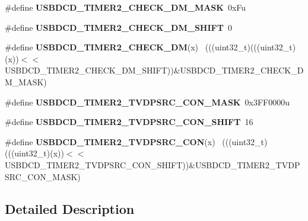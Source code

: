 \begin{DoxyCompactItemize}
\item 
\hypertarget{group___u_s_b_d_c_d___register___masks_gad18eb9508e92e1ff61f1ebdb431665c6}{}\#define {\bfseries U\+S\+B\+D\+C\+D\+\_\+\+T\+I\+M\+E\+R2\+\_\+\+C\+H\+E\+C\+K\+\_\+\+D\+M\+\_\+\+M\+A\+S\+K}~0x\+Fu\label{group___u_s_b_d_c_d___register___masks_gad18eb9508e92e1ff61f1ebdb431665c6}

\item 
\hypertarget{group___u_s_b_d_c_d___register___masks_gab9400adaabb773fb452040ae6130f0ef}{}\#define {\bfseries U\+S\+B\+D\+C\+D\+\_\+\+T\+I\+M\+E\+R2\+\_\+\+C\+H\+E\+C\+K\+\_\+\+D\+M\+\_\+\+S\+H\+I\+F\+T}~0\label{group___u_s_b_d_c_d___register___masks_gab9400adaabb773fb452040ae6130f0ef}

\item 
\hypertarget{group___u_s_b_d_c_d___register___masks_gaf7bad1d25f77ef01168762501b1b6bf7}{}\#define {\bfseries U\+S\+B\+D\+C\+D\+\_\+\+T\+I\+M\+E\+R2\+\_\+\+C\+H\+E\+C\+K\+\_\+\+D\+M}(x)                            ~(((uint32\+\_\+t)(((uint32\+\_\+t)(x))$<$$<$U\+S\+B\+D\+C\+D\+\_\+\+T\+I\+M\+E\+R2\+\_\+\+C\+H\+E\+C\+K\+\_\+\+D\+M\+\_\+\+S\+H\+I\+F\+T))\&U\+S\+B\+D\+C\+D\+\_\+\+T\+I\+M\+E\+R2\+\_\+\+C\+H\+E\+C\+K\+\_\+\+D\+M\+\_\+\+M\+A\+S\+K)\label{group___u_s_b_d_c_d___register___masks_gaf7bad1d25f77ef01168762501b1b6bf7}

\item 
\hypertarget{group___u_s_b_d_c_d___register___masks_ga605cbc2c9a476de6aa9f303d8ee8e7da}{}\#define {\bfseries U\+S\+B\+D\+C\+D\+\_\+\+T\+I\+M\+E\+R2\+\_\+\+T\+V\+D\+P\+S\+R\+C\+\_\+\+C\+O\+N\+\_\+\+M\+A\+S\+K}~0x3\+F\+F0000u\label{group___u_s_b_d_c_d___register___masks_ga605cbc2c9a476de6aa9f303d8ee8e7da}

\item 
\hypertarget{group___u_s_b_d_c_d___register___masks_gaf40b7173544983b30be78a40456e1ff7}{}\#define {\bfseries U\+S\+B\+D\+C\+D\+\_\+\+T\+I\+M\+E\+R2\+\_\+\+T\+V\+D\+P\+S\+R\+C\+\_\+\+C\+O\+N\+\_\+\+S\+H\+I\+F\+T}~16\label{group___u_s_b_d_c_d___register___masks_gaf40b7173544983b30be78a40456e1ff7}

\item 
\hypertarget{group___u_s_b_d_c_d___register___masks_ga5e7a56f70485eff849aebbc23dcc5aa3}{}\#define {\bfseries U\+S\+B\+D\+C\+D\+\_\+\+T\+I\+M\+E\+R2\+\_\+\+T\+V\+D\+P\+S\+R\+C\+\_\+\+C\+O\+N}(x)                      ~(((uint32\+\_\+t)(((uint32\+\_\+t)(x))$<$$<$U\+S\+B\+D\+C\+D\+\_\+\+T\+I\+M\+E\+R2\+\_\+\+T\+V\+D\+P\+S\+R\+C\+\_\+\+C\+O\+N\+\_\+\+S\+H\+I\+F\+T))\&U\+S\+B\+D\+C\+D\+\_\+\+T\+I\+M\+E\+R2\+\_\+\+T\+V\+D\+P\+S\+R\+C\+\_\+\+C\+O\+N\+\_\+\+M\+A\+S\+K)\label{group___u_s_b_d_c_d___register___masks_ga5e7a56f70485eff849aebbc23dcc5aa3}

\end{DoxyCompactItemize}


\subsection{Detailed Description}
